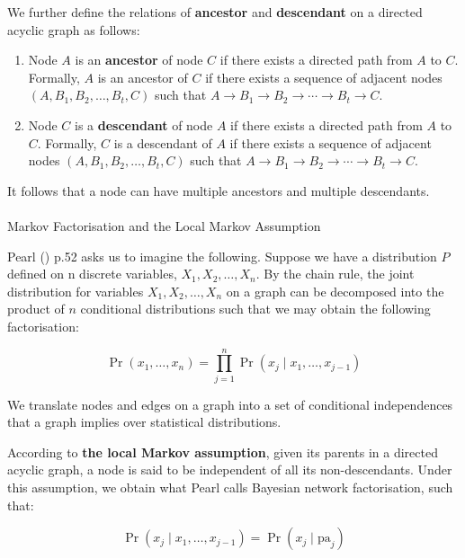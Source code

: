 \documentclass[
  single column]{article}
\makeatletter
\let\oldparagraph\paragraph
\renewcommand{\paragraph}{
    \@ifstar
      \xxxParagraphStar
      \xxxParagraphNoStar
  }
\newcommand{\xxxParagraphStar}[1]{\oldparagraph*{#1}\mbox{}}
\newcommand{\xxxParagraphNoStar}[1]{\oldparagraph{#1}\mbox{}}
\providecommand{\tightlist}{%
  \setlength{\itemsep}{0pt}\setlength{\parskip}{0pt}}\usepackage{longtable,booktabs,array}
\makeatother
\begin{document}
We further define the relations of \textbf{ancestor} and
\textbf{descendant} on a directed acyclic graph as follows:

\begin{enumerate}
\def\labelenumi{\arabic{enumi}.}
\tightlist
\item
  Node \(A\) is an \textbf{ancestor} of node \(C\) if there exists a
  directed path from \(A\) to \(C\). Formally, \(A\) is an ancestor of
  \(C\) if there exists a sequence of adjacent nodes
  \((A, B_1, B_2, \ldots, B_t, C)\) such that
  \(A \rightarrow B_1 \rightarrow B_2 \rightarrow \cdots \rightarrow B_t \rightarrow C\).
\item
  Node \(C\) is a \textbf{descendant} of node \(A\) if there exists a
  directed path from \(A\) to \(C\). Formally, \(C\) is a descendant of
  \(A\) if there exists a sequence of adjacent nodes
  \((A, B_1, B_2, \ldots, B_t, C)\) such that
  \(A \rightarrow B_1 \rightarrow B_2 \rightarrow \cdots \rightarrow B_t \rightarrow C\).
\end{enumerate}

It follows that a node can have multiple ancestors and multiple
descendants.

\paragraph{Markov Factorisation and the Local Markov
Assumption}\label{markov-factorisation-and-the-local-markov-assumption}

Pearl () p.52 asks us to imagine the
following. Suppose we have a distribution \(P\) defined on n discrete
variables, \(X_1, X_2, \dots, X_n\). By the chain rule, the joint
distribution for variables \(X_1, X_2, \dots, X_n\) on a graph can be
decomposed into the product of \(n\) conditional distributions such that
we may obtain the following factorisation:

\[
\Pr(x_1, \dots, x_n) = \prod_{j=1}^n \Pr(x_j \mid x_1, \dots, x_{j-1})
\]

We translate nodes and edges on a graph into a set of conditional
independences that a graph implies over statistical distributions.

According to \textbf{the local Markov assumption}, given its parents in
a directed acyclic graph, a node is said to be independent of all its
non-descendants. Under this assumption, we obtain what Pearl calls
Bayesian network factorisation, such that:

\[
\Pr(x_j \mid x_1, \dots, x_{j-1}) = \Pr(x_j \mid \text{pa}_j)
\]
\end{document}
